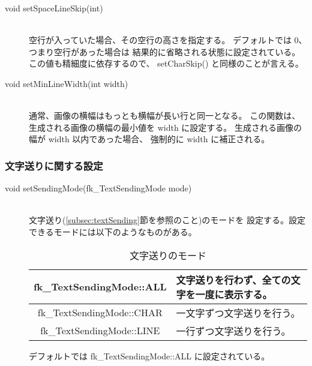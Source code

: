 \begin{description}
\item[void setSpaceLineSkip(int)] ~ \\
	空行が入っていた場合、その空行の高さを指定する。
	デフォルトでは 0、つまり空行があった場合は
	結果的に省略される状態に設定されている。
	この値も精細度に依存するので、
	setCharSkip() と同様のことが言える。\\

\item[void setMinLineWidth(int width)] ~ \\
	通常、画像の横幅はもっとも横幅が長い行と同一となる。
	この関数は、生成される画像の横幅の最小値を width に設定する。
	生成される画像の幅が width 以内であった場合、
	強制的に width に補正される。
\end{description}

\subsubsection{文字送りに関する設定} \label{subsubsec:sendRef}
\begin{description}
\item[void setSendingMode(fk\_TextSendingMode mode)] ~ \\
	文字送り(\ref{subsec:textSending}節を参照のこと)のモードを
	設定する。設定できるモードには以下のようなものがある。
		\begin{table}[H]
		\caption{文字送りのモード}
		\label{tbl:textSending}
		\begin{center}
		\begin{tabular}{|c|l|}
		\hline
		fk\_TextSendingMode::ALL &
		文字送りを行わず、全ての文字を一度に表示する。
		\\ \hline
		fk\_TextSendingMode::CHAR &
		一文字ずつ文字送りを行う。\\ \hline
		fk\_TextSendingMode::LINE &
		一行ずつ文字送りを行う。\\ \hline
		\end{tabular}
		\end{center}
		\end{table}
	デフォルトでは fk\_TextSendingMode::ALL に設定されている。
\end{description}


